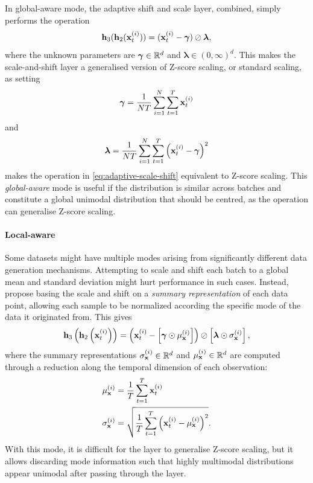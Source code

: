 \documentclass{statsmsc}
\begin{document}
{In global-aware mode, the adaptive shift and scale layer, combined, simply performs the operation
\begin{equation}\label{eq:adaptive-scale-shift}
    \mathbf{h}_3(\mathbf{h}_2(\mathbf{x}_t^{(i)}))=(\mathbf{x}_t^{(i)} - \bm\gamma) \oslash \bm\lambda,
\end{equation}
where the unknown parameters are $\bm\gamma \in \mathbb{R}^d$ and $\bm\lambda \in (0,\infty)^d$.
This makes the scale-and-shift layer a generalised version of
Z-score scaling, or standard scaling, as setting
\begin{equation}
    \bm\gamma=\frac{1}{N T}  \sum^{N}_{i=1} \sum^{T}_{t=1} \mathbf{x}_{t}^{(i)}
\end{equation}
and
\begin{equation}
    \bm\lambda=\frac{1}{N T} \sum^{N}_{i=1} \sum^{T}_{t=1} \left(\mathbf{x}_{t}^{(i)}- \bm\gamma\right)^2
\end{equation}
makes the operation in \cref{eq:adaptive-scale-shift} equivalent to Z-score scaling.
This \textit{global-aware} mode is useful if the distribution is similar across batches
and constitute a global unimodal distribution that should be centred, as the operation can generalise Z-score scaling.

\paragraph{Local-aware}%
\label{par:Local-aware}

Some datasets might have multiple modes arising from significantly different
data generation mechanisms. Attempting to scale and shift each batch to a global mean and
standard deviation might hurt performance in such cases. Instead, \citeauthor{dain} propose
basing the scale and shift on a \textit{summary representation} of each data point, allowing
each sample to be normalized according the specific mode  of the data it originated from.
This gives
\begin{equation}
    \mathbf{h}_3\left(\mathbf{h}_2\left(\mathbf{x}_t^{(i)}\right)\right)=
    \left(\mathbf{x}_t^{(i)} - \left[\bm\gamma \odot \mu_{\mathbf{x}}^{(i)}\right]\right) \oslash \left[\bm\lambda \odot \sigma_{\mathbf{x}}^{(i)}\right],
\end{equation}
where the summary representations $\sigma_{\mathbf{x}}^{(i)} \in \mathbb{R}^d$ and $\mu_{\mathbf{x}}^{(i)} \in \mathbb{R}^d$ are computed through a reduction
along the temporal dimension of each observation:
\begin{align}
    \mu_{\mathbf{x}}^{(i)}&=\frac{1}{T} \sum^{T}_{t=1} \mathbf{x}^{(i)}_t  \\
    \sigma_{\mathbf{x}}^{(i)}&=\sqrt{\frac{1}{T}  \sum^{T}_{t=1} \left(\mathbf{x}^{(i)}_t- \mu_{\mathbf{x}}^{(i)} \right)^2}.
\end{align}
With this mode, it is difficult for the layer to generalise Z-score scaling, but it allows
discarding mode information such that highly multimodal distributions appear unimodal after passing
through the layer.

}
\end{document}
